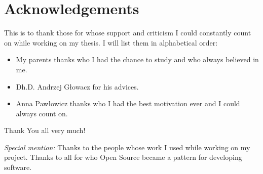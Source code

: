 \chapter{Acknowledgements}
This is to thank those for whose support and criticism I could constantly count on
while working on my thesis. I will list them in alphabetical order:

\begin{itemize}
\item My parents thanks who I had the chance to study and who always believed in me.  
\item Dh.D. Andrzej Głowacz for his advices. 
\item Anna Pawłowicz thanks who I had the best motivation ever and I could always count on.
\end{itemize}

Thank You all very much!

\emph{Special mention:} Thanks to the people whose work I used while working on my project.
Thanks to all for who Open Source became a pattern for developing software.
